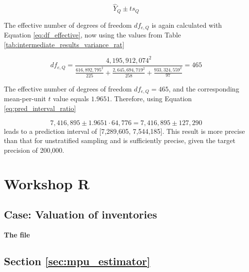 \begin{equation}
\hat{Y}_Q \pm t s_Q 
\label{eq:pred_interval_strat_rat}
\end{equation}

The effective number of degrees of freedom $df_{e, Q}$ is again calculated with Equation \ref{eq:df_effective}, now using the values from Table \ref{tab:intermediate_results_variance_rat}

\begin{equation*}
df_{e, Q} = \frac{4,195,912,074^2}{\frac{616,892,795^2}{225} + \frac{2,645,694,719^2}{258} + \frac{933,324,559^2}{97}} = 465
\end{equation*}

The effective number of degrees of freedom $df_{e, Q} = 465$, and the corresponding mean-per-unit $t$ value equals $1.9651$. Therefore, using Equation \ref{eq:pred_interval_ratio} 

\begin{equation*}
7,416,895 \pm 1.9651 \cdot 64,776 = 7,416,895 \pm 127,290
\end{equation*}
leads to a prediction interval of [7,289,605,\hspace{0.5em} 7,544,185]. This result is more precise than that for unstratified sampling and is sufficiently precise, given the target precision of 200,000.


\section{Workshop R} %
\label{sec:workshop04}

\subsection{Case: Valuation of inventories}

\begin{exercise}
\label{ex:inventoryData}

\textbf{The  file}



\end{exercise}

\subsection{Section \ref{sec:mpu_estimator}}

